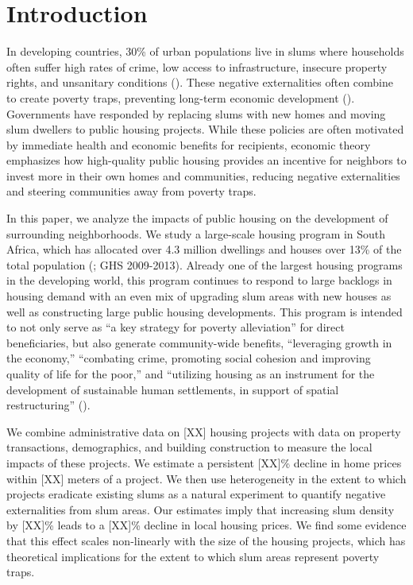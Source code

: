\documentclass[12pt]{article}
\begin{document}
\section{Introduction} \label{sec:introduction}



In developing countries, 30\% of urban populations live in slums where households often suffer high rates of crime, low access to infrastructure, insecure property rights, and unsanitary conditions (\cite{mdg}).  These negative externalities often combine to create poverty traps, preventing long-term economic development (\cite{10.1257/jep.27.4.187}). Governments have responded by replacing slums with new homes and moving slum dwellers to public housing projects.  While these policies are often motivated by immediate health and economic benefits for recipients, economic theory emphasizes how high-quality public housing provides an incentive for neighbors to invest more in their own homes and communities, reducing negative externalities and steering communities away from poverty traps.

In this paper, we analyze the impacts of public housing on the development of surrounding neighborhoods.  We study a large-scale housing program in South Africa, which has allocated over 4.3 million dwellings and houses over 13\% of the total population (\cite{dhsreports}; GHS 2009-2013).  Already one of the largest housing programs in the developing world, this program continues to respond to large backlogs in housing demand with an even mix of upgrading slum areas with new houses as well as constructing large public housing developments.  This program is intended to not only serve as ``a key strategy for poverty alleviation'' for direct beneficiaries, but also generate community-wide benefits, ``leveraging growth in the economy,'' ``combating crime, promoting social cohesion and improving quality of life for the poor,'' and ``utilizing housing as an instrument for the development of sustainable human settlements, in support of spatial restructuring'' (\cite{bng}). 

We combine administrative data on [XX] housing projects with data on property transactions, demographics, and building construction to measure the local impacts of these projects.  We estimate a persistent [XX]\% decline in home prices within [XX] meters of a project.  We then use heterogeneity in the extent to which projects eradicate existing slums as a natural experiment to quantify negative externalities from slum areas.  Our estimates imply that increasing slum density by [XX]\% leads to a [XX]\% decline in local housing prices.  We find some evidence that this effect scales non-linearly with the size of the housing projects, which has theoretical implications for the extent to which slum areas represent poverty traps.
\end{document}
